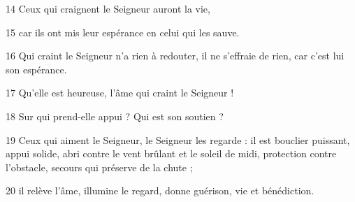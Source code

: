 14 Ceux qui craignent le Seigneur auront la vie,

15 car ils ont mis leur espérance en celui qui les sauve.

16 Qui craint le Seigneur n’a rien à redouter, il ne s’effraie de rien, car c’est lui son espérance.

17 Qu’elle est heureuse, l’âme qui craint le Seigneur !

18 Sur qui prend-elle appui ? Qui est son soutien ?

19 Ceux qui aiment le Seigneur, le Seigneur les regarde : il est bouclier puissant, appui solide, abri contre le vent brûlant et le soleil de midi, protection contre l’obstacle, secours qui préserve de la chute ;

20 il relève l’âme, illumine le regard, donne guérison, vie et bénédiction.